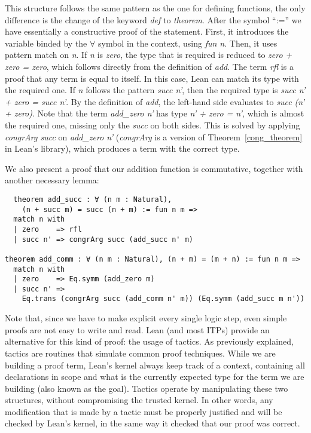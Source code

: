 This structure follows the same pattern as the one for defining functions, the only difference is the change of the keyword \textit{def} to \textit{theorem}. After the symbol ``:='' we have essentially a constructive proof of the statement. First, it introduces the variable binded by the $\forall$ symbol in the context, using \textit{fun n}. Then, it uses pattern match on \textit{n}. If \textit{n} is \textit{zero}, the type that is required is reduced to \textit{zero + zero = zero}, which follows directly from the definition of \textit{add}. The term \textit{rfl} is a proof that any term is equal to itself. In this case, Lean can match its type with the required one. If \textit{n} follows the pattern \textit{succ n'}, then the required type is \textit{succ n' + zero = succ n'}. By the definition of \textit{add}, the left-hand side evaluates to \textit{succ (n' + zero)}.
Note that the term \textit{add\_zero n'} has type \textit{n' + zero = n'}, which is almost the required one, missing only the \textit{succ} on both sides. This is solved by applying \textit{congrArg succ} on \textit{add\_zero n'} (\textit{congrArg} is a version of Theorem~\ref{cong_theorem} in Lean's library), which produces a term with the correct type.


We also present a proof that our addition function is commutative, together with another necessary lemma:

\begin{verbatim}
  theorem add_succ : ∀ (n m : Natural),
    (n + succ m) = succ (n + m) := fun n m =>
  match n with
  | zero    => rfl
  | succ n' => congrArg succ (add_succ n' m)

theorem add_comm : ∀ (n m : Natural), (n + m) = (m + n) := fun n m =>
  match n with
  | zero    => Eq.symm (add_zero m)
  | succ n' =>
    Eq.trans (congrArg succ (add_comm n' m)) (Eq.symm (add_succ m n'))
\end{verbatim}

Note that, since we have to make explicit every single logic step, even simple proofs are not easy to write and read. Lean (and most ITPs) provide an alternative for this kind of proof: the usage of tactics. As previously explained, tactics are routines that simulate common proof techniques. While we are building a proof term, Lean's kernel always keep track of a context, containing all declarations in scope and what is the currently expected type for the term we are building (also known as the goal). Tactics operate by manipulating these two structures, without compromising the trusted kernel. In other words, any modification that is made by a tactic must be properly justified and will be checked by Lean's kernel, in the same way it checked that our proof was correct.

